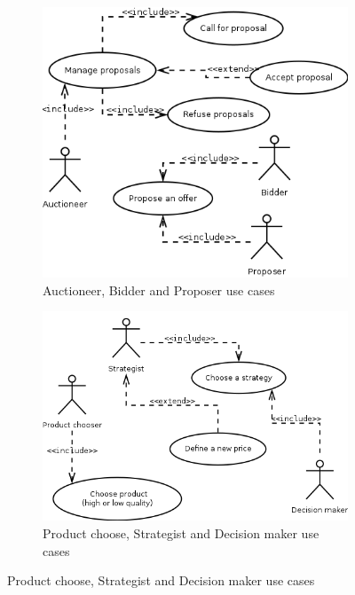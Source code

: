 \documentclass[a4paper,11pt]{report}
\begin{document}
  \begin{figure}[ht!]
    \begin{subfigure}{0.5\textwidth}
       \centering
       \includegraphics[width=\textwidth]{media/use_cases_1.png}
       \caption{Auctioneer, Bidder and Proposer use cases}
       \label{figure:use_cases_1}
    \end{subfigure}
    \begin{subfigure}{0.5\textwidth}
       \centering
       \includegraphics[width=\textwidth]{media/use_cases_2.png}
       \caption{Product choose, Strategist and Decision maker use cases}
       \label{figure:use_cases_2}
    \end{subfigure}
    

\end{figure}
\end{document}
